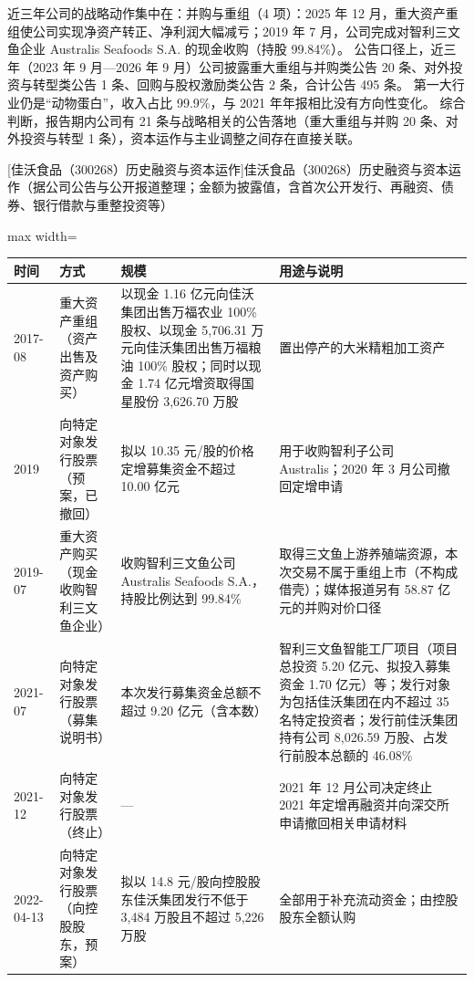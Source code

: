  近三年公司的战略动作集中在：并购与重组（4 项）：2025 年 12 月，重大资产重组使公司实现净资产转正、净利润大幅减亏；2019 年 7 月，公司完成对智利三文鱼企业 Australis Seafoods S.A. 的现金收购（持股 99.84\%）。 公告口径上，近三年（2023 年 9 月---2026 年 9 月）公司披露重大重组与并购类公告 20 条、对外投资与转型类公告 1 条、回购与股权激励类公告 2 条，合计公告 495 条。 第一大行业仍是“动物蛋白”，收入占比 99.9\%，与 2021 年年报相比没有方向性变化。 综合判断，报告期内公司有 21 条与战略相关的公告落地（重大重组与并购 20 条、对外投资与转型 1 条），资本运作与主业调整之间存在直接关联。

\begin{center}\small\setlength{\tabcolsep}{4pt}
[佳沃食品（300268）历史融资与资本运作]{佳沃食品（300268）历史融资与资本运作（据公司公告与公开报道整理；金额为披露值，含首次公开发行、再融资、债券、银行借款与重整投资等）}
\begin{adjustbox}{max width=\textwidth}
\begin{tabular}{@{}p{1.45cm}p{2.55cm}p{4.05cm}p{4.95cm}@{}}
\toprule
时间 & 方式 & 规模 & 用途与说明 \\
\midrule
2017-08 & 重大资产重组（资产出售及资产购买） & 以现金 1.16 亿元向佳沃集团出售万福农业 100\% 股权、\allowbreak{}以现金 5,\allowbreak{}706.31 万元向佳沃集团出售万福粮油 100\% 股权；同时以现金 1.74 亿元增资取得国星股份 3,\allowbreak{}626.70 万股 & 置出停产的大米精粗加工资产 \\
2019 & 向特定对象发行股票（预案，已撤回） & 拟以 10.35 元/\allowbreak{}股的价格定增募集资金不超过 10.00 亿元 & 用于收购智利子公司 Australis；2020 年 3 月公司撤回定增申请 \\
2019-07 & 重大资产购买（现金收购智利三文鱼企业） & 收购智利三文鱼公司 Australis Seafoods S.A.，\allowbreak{}持股比例达到 99.84\% & 取得三文鱼上游养殖端资源，\allowbreak{}本次交易不属于重组上市（不构成借壳）；媒体报道另有 58.87 亿元的并购对价口径 \\
2021-07 & 向特定对象发行股票（募集说明书） & 本次发行募集资金总额不超过 9.20 亿元（含本数） & 智利三文鱼智能工厂项目（项目总投资 5.20 亿元、\allowbreak{}拟投入募集资金 1.70 亿元）等；发行对象为包括佳沃集团在内不超过 35 名特定投资者；发行前佳沃集团持有公司 8,\allowbreak{}026.59 万股、\allowbreak{}占发行前股本总额的 46.08\% \\
2021-12 & 向特定对象发行股票（终止） & --- & 2021 年 12 月公司决定终止 2021 年定增再融资并向深交所申请撤回相关申请材料 \\
2022-04-13 & 向特定对象发行股票（向控股股东，预案） & 拟以 14.8 元/\allowbreak{}股向控股股东佳沃集团发行不低于 3,\allowbreak{}484 万股且不超过 5,\allowbreak{}226 万股 & 全部用于补充流动资金；由控股股东全额认购 \\

\end{tabular}
\end{adjustbox}
\end{center}
